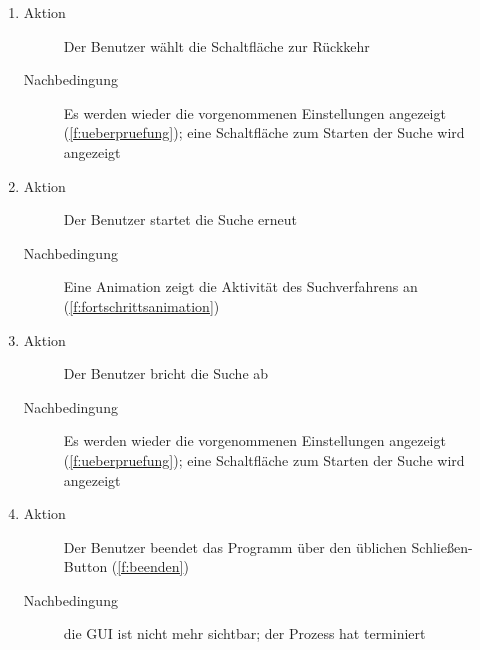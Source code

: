 \begin{enumerate} [label=\bfseries /TS \arabic*0/, leftmargin=*]
\begin{enumerate}
\begin{description}
		\end{description}
		\item
		\begin{description}
			\item[Aktion] Der Benutzer wählt die Schaltfläche zur Rückkehr
			\item[Nachbedingung] Es werden wieder die vorgenommenen Einstellungen angezeigt (\ref{f:ueberpruefung}); eine Schaltfläche zum Starten der Suche wird angezeigt
		\end{description}
		\item
		\begin{description}
			\item[Aktion] Der Benutzer startet die Suche erneut
			\item[Nachbedingung] Eine Animation zeigt die Aktivität des Suchverfahrens an (\ref{f:fortschrittsanimation})
		\end{description}
		\item
		\begin{description}
			\item[Aktion] Der Benutzer bricht die Suche ab
			\item[Nachbedingung] Es werden wieder die vorgenommenen Einstellungen angezeigt (\ref{f:ueberpruefung}); eine Schaltfläche zum Starten der Suche wird angezeigt
		\end{description}
		\item
		\begin{description}
			\item[Aktion] Der Benutzer beendet das Programm über den üblichen Schließen-Button (\ref{f:beenden})
			\item[Nachbedingung] die GUI ist nicht mehr sichtbar; der Prozess hat terminiert
		\end{description}
	\end{enumerate}


\end{enumerate}

